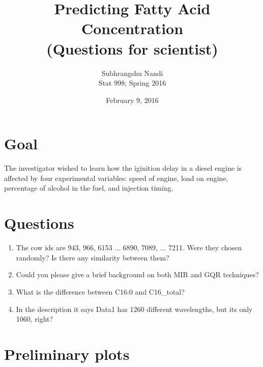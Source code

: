 \documentclass[11pt,a4paper]{article}
\begin{document}
\title{Predicting Fatty Acid Concentration \\
(Questions for scientist)}
\author{Subhrangshu Nandi\\
  Stat 998; Spring 2016}
\date{February 9, 2016}

\maketitle

\section*{Goal}
The investigator wished to learn how the iginition delay in a diesel engine is affected by four experimental variables: speed of engine, load on engine, percentage of alcohol in the fuel, and injection timing.

\section*{Questions}
\begin{enumerate}
\item The cow ids are 943, 966, 6153 $\dots$ 6890, 7089, $\dots$ 7211. Were they chosen randomly? Is there any similarity between them?
\item Could you please give a brief background on both MIR and GQR techniques?
\item What is the difference between C16:0 and C16\_total?
\item In the description it says Data1 has 1260 different wavelengths, but its only 1060, right?

\end{enumerate}

\section*{Preliminary plots}
\end{document}

